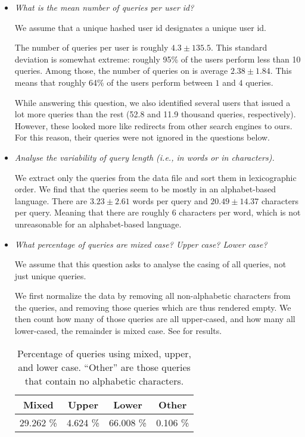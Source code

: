\begin{itemize}

\item \emph{What is the mean number of queries per user id?}

We assume that a unique hashed user id designates a unique user id.

The number of queries per user is roughly $4.3\pm135.5$. This standard
deviation is somewhat extreme: roughly 95\% of the users perform less than 10
queries. Among those, the number of queries on is average $2.38 \pm 1.84$. This
means that roughly 64\% of the users perform between $1$ and $4$ queries.

While answering this question, we also identified several users that issued a
lot more queries than the rest (52.8 and 11.9 thousand queries, respectively).
However, these looked more like redirects from other search engines to ours.
For this reason, their queries were not ignored in the questions below.

\item \emph{Analyse the variability of query length (i.e., in words or in
characters).}

We extract only the queries from the data file and sort them in lexicographic
order. We find that the queries seem to be mostly in an alphabet-based
language. There are $3.23 \pm 2.61$ words per query and $20.49 \pm 14.37$
characters per query. Meaning that there are roughly 6 characters per word,
which is not unreasonable for an alphabet-based language.

\item \emph{What percentage of queries are mixed case? Upper case? Lower case?}

We assume that this question asks to analyse the casing of all queries, not
just unique queries.

We first normalize the data by removing all non-alphabetic characters from the
queries, and removing those queries which are thus rendered empty. We then
count how many of those queries are all upper-cased, and how many all
lower-cased, the remainder is mixed case. See  for
results.

\begin{table}[h!]
\centering
\begin{tabular}{|c|c|c|c|}
\hline
\textbf{Mixed} & \textbf{Upper} & \textbf{Lower} & \textbf{Other} \\
\hline
29.262 \%      & 4.624 \%       & 66.008 \%      & 0.106 \% \\
\hline
\end{tabular}
\caption[]{Percentage of queries using mixed, upper, and lower case. ``Other''
are those queries that contain no alphabetic characters.}
\label{table:casing}
\end{table}


\end{itemize}
